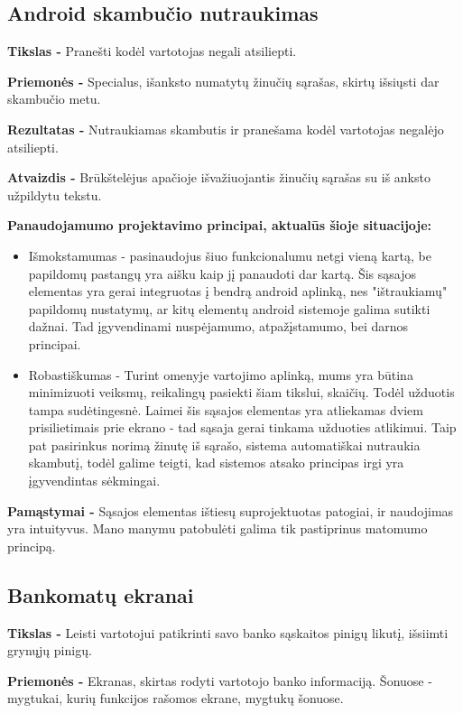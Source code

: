 ﻿\documentclass[a4paper, 12pt]{article}
\begin{document}
	\subsection{Android skambučio nutraukimas}
		\textbf{Tikslas -}
		Pranešti kodėl vartotojas negali atsiliepti.

		\textbf{Priemonės -}
		Specialus, išanksto numatytų žinučių sąrašas, skirtų išsiųsti dar skambučio metu.

		\textbf{Rezultatas -}
		Nutraukiamas skambutis ir pranešama kodėl vartotojas negalėjo atsiliepti.

		\textbf{Atvaizdis -}
		Brūkštelėjus apačioje išvažiuojantis žinučių sąrašas su iš anksto užpildytu tekstu.

		\textbf{Panaudojamumo projektavimo principai, aktualūs šioje situacijoje:}
		\begin{itemize}
		\item Išmokstamumas - pasinaudojus šiuo funkcionalumu netgi vieną kartą, be papildomų pastangų yra aišku kaip jį panaudoti dar kartą.
		Šis sąsajos elementas yra gerai integruotas į bendrą android aplinką, nes "ištraukiamų" papildomų nustatymų, ar kitų elementų android sistemoje galima sutikti dažnai.
		Tad įgyvendinami nuspėjamumo, atpažįstamumo, bei darnos principai.
		\item Robastiškumas - Turint omenyje vartojimo aplinką, mums yra būtina minimizuoti veiksmų, reikalingų pasiekti šiam tikslui, skaičių.
		Todėl užduotis tampa sudėtingesnė.
		Laimei šis sąsajos elementas yra atliekamas dviem prisilietimais prie ekrano - tad sąsaja gerai tinkama užduoties atlikimui.
		Taip pat pasirinkus norimą žinutę iš sąrašo, sistema automatiškai nutraukia skambutį, todėl galime teigti, kad sistemos atsako principas irgi yra įgyvendintas sėkmingai.
		\end{itemize}

		\textbf{Pamąstymai -}
		Sąsajos elementas ištiesų suprojektuotas patogiai, ir naudojimas yra intuityvus.
		Mano manymu patobulėti galima tik pastiprinus matomumo principą. 
	
	\subsection{Bankomatų ekranai}
		\textbf{Tikslas -}
		Leisti vartotojui patikrinti savo banko sąskaitos pinigų likutį, išsiimti grynųjų pinigų.

		\textbf{Priemonės -}
		Ekranas, skirtas rodyti vartotojo banko informaciją.
		Šonuose - mygtukai, kurių funkcijos rašomos ekrane, mygtukų šonuose.
\end{document}
